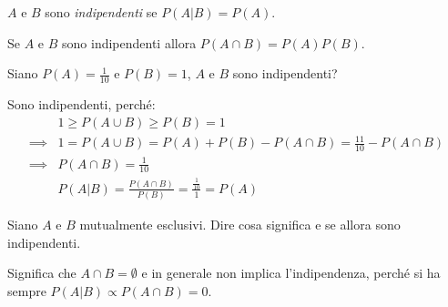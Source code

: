 \begin{defn}[Indipendenza]
	$A$ e $B$ sono \emph{indipendenti} se $P(A|B) = P(A)$.
\end{defn}

\begin{ex}
	Se $A$ e $B$ sono indipendenti allora $P(A\cap B) = P(A)P(B)$.
\end{ex}

\begin{ex}
	Siano $P(A)=\frac1{10}$ e $P(B)=1$, $A$ e $B$ sono indipendenti?
\end{ex}

\begin{solution}
	Sono indipendenti, perché:
	\begin{align*}
		&1 \ge P(A\cup B) \ge P(B) = 1 \\
		\implies &1 = P(A\cup B) = P(A) + P(B) - P(A\cap B) = \frac{11}{10} - P(A\cap B) \\
		\implies &P(A\cap B) = \frac{1}{10} \\
		&P(A|B) = \frac{P(A\cap B)}{P(B)} = \frac{\frac{1}{10}}{1} = P(A)
	\end{align*}
\end{solution}

\begin{ex}
	Siano $A$ e $B$ mutualmente esclusivi. Dire cosa significa e se allora sono indipendenti.
\end{ex}

\begin{solution}
	Significa che $A\cap B=\emptyset$ e in generale non implica l'indipendenza, perché si ha sempre $P(A|B)\propto P(A\cap B)=0$.
\end{solution}
